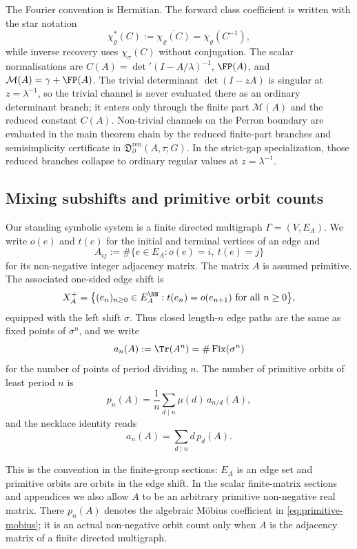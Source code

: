 The Fourier convention is Hermitian.  The forward class coefficient is
written with the star notation
\[
  \chi_\varrho^\ast(C)
  :=\overline{\chi_\varrho(C)}
  =\chi_\varrho(C^{-1}),
\]
while inverse recovery uses \(\chi_\sigma(C)\) without conjugation.  The
scalar normalisations are
\(C(A)=\det'(I-A/\lambda)^{-1}\),
\(\FP(A)\), and \(\mathcal M(A)=\gamma+\FP(A)\).  The trivial determinant
\(\det(I-zA)\) is singular at \(z=\lambda^{-1}\), so the trivial channel
is never evaluated there as an ordinary determinant branch; it enters
only through the finite part \(\mathcal M(A)\) and the reduced constant
\(C(A)\).  Non-trivial channels on the Perron boundary are evaluated in the
main theorem chain by the reduced finite-part branches and semisimplicity
certificate in \(\mathfrak D_{\partial}^{\mathrm{ren}}(A,\tau;G)\).  In the
strict-gap specialization, those reduced branches collapse to ordinary
regular values at \(z=\lambda^{-1}\).

\subsection{Mixing subshifts and primitive orbit counts}

Our standing symbolic system is a finite directed multigraph
\(\Gamma=(V,E_A)\).  We write \(o(e)\) and \(t(e)\) for the initial and
terminal vertices of an edge and
\[
  A_{ij}:=\#\{e\in E_A:o(e)=i,\ t(e)=j\}
\]
for its non-negative integer adjacency matrix.  The matrix \(A\) is
assumed primitive.  The associated one-sided edge shift is
\[
  X_A^+
  =
  \bigl\{(e_n)_{n\ge 0}\in E_A^{\NN}:
    t(e_n)=o(e_{n+1})\ \text{for all }n\ge 0\bigr\},
\]
equipped with the left shift \(\sigma\).  Thus closed length-\(n\) edge
paths are the same as fixed points of \(\sigma^n\), and we write
\[
  a_n(A):=\Tr(A^n)=\#\operatorname{Fix}(\sigma^n)
\]
for the number of points of period dividing \(n\). The number of
primitive orbits of least period \(n\) is
\begin{equation}\label{eq:primitive-mobius}
  p_n(A)=\frac{1}{n}\sum_{d\mid n}\mu(d)\,a_{n/d}(A),
\end{equation}
and the necklace identity reads
\begin{equation}\label{eq:trace-primitive-identity}
  a_n(A)=\sum_{d\mid n}d\,p_d(A).
\end{equation}

This is the convention in the finite-group sections: \(E_A\) is an edge
set and primitive orbits are orbits in the edge shift.  In the scalar
finite-matrix sections and appendices we also allow \(A\) to be an
arbitrary primitive non-negative real matrix.  There \(p_n(A)\) denotes
the algebraic M\"obius coefficient in \eqref{eq:primitive-mobius}; it is
an actual non-negative orbit count only when \(A\) is the adjacency
matrix of a finite directed multigraph.

